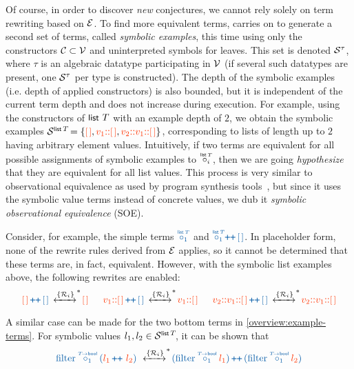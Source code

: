 Of course, in order to discover \emph{new} conjectures,
we cannot rely solely on term rewriting based on $\mathcal{E}$.
To find more equivalent terms, \TheSy carries on to generate a second set of terms, called \emph{symbolic examples},
this time using only the constructors $\mathcal{C} \subset \mathcal{V}$
and uninterpreted symbols for leaves.
This set is denoted $\mathcal{S}^{\tau}$, where $\tau$ is an algebraic datatype participating in $\mathcal{V}$
(if several such datatypes are present, one $\mathcal{S}^{\tau}$ per type is constructed).
The depth of the symbolic examples (i.e. depth of applied constructors) is also bounded, but it is independent of the current term depth and does not increase during execution.
For example, using the constructors of $\tlist~T$ with an example depth of $2$,
we obtain the symbolic examples 
$\Symexes{\tlist\,T\!} = \{
  {\clrsymex\lnil}, {\clrsymex v_1{\cons}\lnil}, 
  {\clrsymex v_2{\cons} v_1{\cons}\lnil}\}$, 
corresponding to lists of length up to $2$ having arbitrary element values.
Intuitively, if two terms are equivalent for all possible assignments of symbolic examples to $\pholder{i}{\tlist\,T}$,
then we are going \emph{hypothesize} that they are equivalent for all
list values.
This process is very similar to observational equivalence as used by program
synthesis tools~\cite{CAV2103:Albarghouthi,Notices2013:Udupa}, but since it uses the symbolic value terms instead of concrete
values, we dub it \emph{symbolic observational equivalence} (SOE).


\medskip
Consider, for example, the simple terms $\clrterm\pholder{1}{\tlist\,T}$
and $\clrterm\pholder{1}{\tlist\,T}\!\concat\lnil$.
In placeholder form, none of the rewrite rules derived from $\mathcal{E}$ applies, so it cannot be determined that these terms are, in fact, equivalent.
However, with the symbolic list examples above, the following rewrites are enabled:
\[
\TRewriteSysRelation
{\clrterm{\clrsymex\lnil}\concat\lnil}{\clrsymex\lnil}   \hspace{1.5em} 
\TRewriteSysRelation
{\clrterm{\clrsymex v_1{\cons}{\lnil}}\concat\lnil}
  {\clrsymex v_1{\cons}{\lnil}}
 \hspace{1.5em}
\TRewriteSysRelation
{\clrterm{\clrsymex v_2{\cons} v_1{\cons}\lnil}\concat\lnil}
  {\clrsymex v_2{\cons} v_1{\cons}\lnil}
\]

A similar case can be made for the two bottom terms in \eqref{overview:example-terms}.
For symbolic values $l_1,l_2\in\Symexes{\tlist\,T\!}$,
it can be shown that
\[
\TRewriteSysRelation
  {\clrterm\tfilter\pholder{1}{T\!\to\tbool}({\clrsymex l_1} 
    \concat\, {\clrsymex l_2})\,}
  {\clrterm{(\tfilter\pholder{1}{T\!\to\tbool}{\clrsymex l_1})} 
    \concat {(\tfilter\pholder{1}{T\!\to\tbool}{\clrsymex l_2})}}
\]

